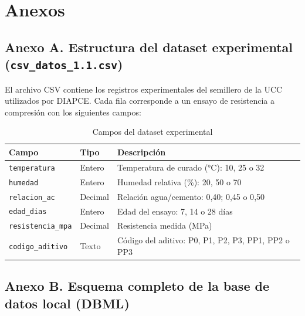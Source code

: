 \section*{Anexos}

\subsection*{Anexo A. Estructura del dataset experimental (\texttt{csv\_datos\_1.1.csv})}

El archivo CSV contiene los registros experimentales del semillero de la UCC utilizados por DIAPCE. Cada fila corresponde a un ensayo de resistencia a compresión con los siguientes campos:

\begin{table}[H]
  \centering
  \caption{Campos del dataset experimental}
  \begin{tabular}{lll}
    \hline
    Campo & Tipo & Descripción \\
    \hline
    \texttt{temperatura}     & Entero   & Temperatura de curado (°C): 10, 25 o 32 \\
    \texttt{humedad}         & Entero   & Humedad relativa (\%): 20, 50 o 70 \\
    \texttt{relacion\_ac}    & Decimal  & Relación agua/cemento: 0{,}40; 0{,}45 o 0{,}50 \\
    \texttt{edad\_dias}      & Entero   & Edad del ensayo: 7, 14 o 28 días \\
    \texttt{resistencia\_mpa}& Decimal  & Resistencia medida (MPa) \\
    \texttt{codigo\_aditivo} & Texto    & Código del aditivo: P0, P1, P2, P3, PP1, PP2 o PP3 \\
    \hline
  \end{tabular}
\end{table}

\subsection*{Anexo B. Esquema completo de la base de datos local (DBML)}

